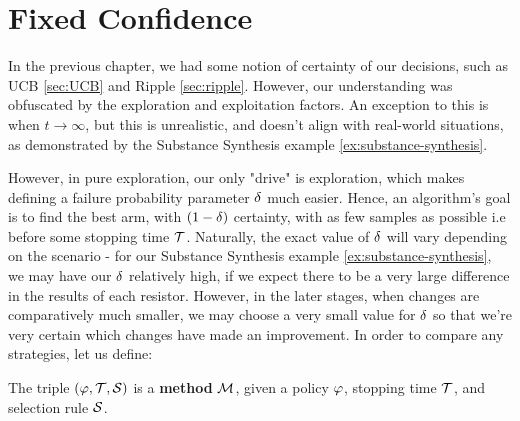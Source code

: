 
\section{Fixed Confidence}
\label{sec:fixedconfidence}

In the previous chapter, we had some notion of certainty of our decisions, such as UCB \ref{sec:UCB} and Ripple \ref{sec:ripple}. However, our understanding was obfuscated by the exploration and exploitation factors. An exception to this is when $t \rightarrow \infty$, but this is unrealistic, and doesn't align with real-world situations, as demonstrated by the Substance Synthesis example \ref{ex:substance-synthesis}.

However, in pure exploration, our only "drive" is exploration, which makes defining a failure probability parameter $\delta$ much easier. Hence, an algorithm's goal is to find the best arm, with $(1-\delta)$ certainty, with as few samples as possible i.e before some stopping time $\mathcal{T}$. Naturally, the exact value of $\delta$ will vary depending on the scenario - for our Substance Synthesis example \ref{ex:substance-synthesis}, we may have our $\delta$ relatively high, if we expect there to be a very large difference in the results of each resistor. However, in the later stages, when changes are comparatively much smaller, we may choose a very small value for $\delta$ so that we're very certain which changes have made an improvement. In order to compare any strategies, let us define:

\begin{definition}\label{def:method}
    The triple $(\varphi, \mathcal{T}, \mathcal{S})$ is a \textbf{method} $\mathcal{M}$, given a policy $\varphi$, stopping time $\mathcal{T}$, and selection rule $\mathcal{S}$.
\end{definition}

